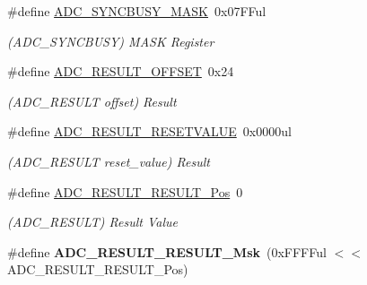 \begin{DoxyCompactItemize}
\item 
\hypertarget{group___s_a_m_l21___a_d_c_ga4cb082a6d2bd0c81821acfb031bfa964}{}\#define \hyperlink{group___s_a_m_l21___a_d_c_ga4cb082a6d2bd0c81821acfb031bfa964}{A\+D\+C\+\_\+\+S\+Y\+N\+C\+B\+U\+S\+Y\+\_\+\+M\+A\+S\+K}~0x07\+F\+Ful\label{group___s_a_m_l21___a_d_c_ga4cb082a6d2bd0c81821acfb031bfa964}

\begin{DoxyCompactList}\small\item\em (A\+D\+C\+\_\+\+S\+Y\+N\+C\+B\+U\+S\+Y) M\+A\+S\+K Register \end{DoxyCompactList}\item 
\hypertarget{group___s_a_m_l21___a_d_c_gac871a3e42abade7bd3d2dcbf3172ce95}{}\#define \hyperlink{group___s_a_m_l21___a_d_c_gac871a3e42abade7bd3d2dcbf3172ce95}{A\+D\+C\+\_\+\+R\+E\+S\+U\+L\+T\+\_\+\+O\+F\+F\+S\+E\+T}~0x24\label{group___s_a_m_l21___a_d_c_gac871a3e42abade7bd3d2dcbf3172ce95}

\begin{DoxyCompactList}\small\item\em (A\+D\+C\+\_\+\+R\+E\+S\+U\+L\+T offset) Result \end{DoxyCompactList}\item 
\hypertarget{group___s_a_m_l21___a_d_c_gad872ef8122ad10f58a6546072b5157c4}{}\#define \hyperlink{group___s_a_m_l21___a_d_c_gad872ef8122ad10f58a6546072b5157c4}{A\+D\+C\+\_\+\+R\+E\+S\+U\+L\+T\+\_\+\+R\+E\+S\+E\+T\+V\+A\+L\+U\+E}~0x0000ul\label{group___s_a_m_l21___a_d_c_gad872ef8122ad10f58a6546072b5157c4}

\begin{DoxyCompactList}\small\item\em (A\+D\+C\+\_\+\+R\+E\+S\+U\+L\+T reset\+\_\+value) Result \end{DoxyCompactList}\item 
\hypertarget{group___s_a_m_l21___a_d_c_ga32c8bee520d5fa7ad752a631166250f8}{}\#define \hyperlink{group___s_a_m_l21___a_d_c_ga32c8bee520d5fa7ad752a631166250f8}{A\+D\+C\+\_\+\+R\+E\+S\+U\+L\+T\+\_\+\+R\+E\+S\+U\+L\+T\+\_\+\+Pos}~0\label{group___s_a_m_l21___a_d_c_ga32c8bee520d5fa7ad752a631166250f8}

\begin{DoxyCompactList}\small\item\em (A\+D\+C\+\_\+\+R\+E\+S\+U\+L\+T) Result Value \end{DoxyCompactList}\item 
\hypertarget{group___s_a_m_l21___a_d_c_ga62f7022b6431b384071429474546da50}{}\#define {\bfseries A\+D\+C\+\_\+\+R\+E\+S\+U\+L\+T\+\_\+\+R\+E\+S\+U\+L\+T\+\_\+\+Msk}~(0x\+F\+F\+F\+Ful $<$$<$ A\+D\+C\+\_\+\+R\+E\+S\+U\+L\+T\+\_\+\+R\+E\+S\+U\+L\+T\+\_\+\+Pos)\label{group___s_a_m_l21___a_d_c_ga62f7022b6431b384071429474546da50}


\end{DoxyCompactItemize}
